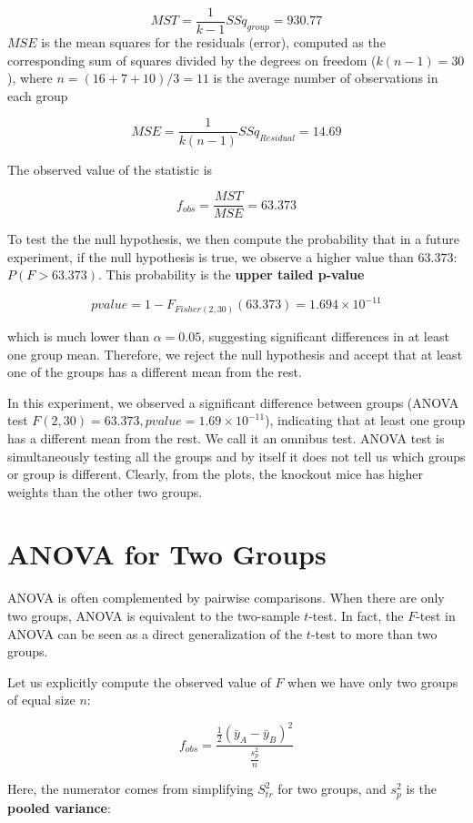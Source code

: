 \documentclass[
]{book}
\begin{document}
\[MST=\frac{1}{k-1}SSq_{group}=930.77\]
\(MSE\) is the mean squares for the residuals (error), computed as the corresponding sum of squares divided by the degrees on freedom (\(k(n-1)=30\)), where \(n=(16 + 7 + 10)/3=11\) is the average number of observations in each group

\[MSE=\frac{1}{k(n-1)}SSq_{Residual}=14.69\]

The observed value of the statistic is

\[f_{obs}=\frac{MST}{MSE}=63.373\]

To test the the null hypothesis, we then compute the probability that in a future experiment, if the null hypothesis is true, we observe a higher value than \(63.373\): \(P(F>63.373)\). This probability is the \textbf{upper tailed p-value}

\[pvalue=1-F_{Fisher(2,30)}(63.373)=1.694 \times 10^{-11}\]

which is much lower than \(\alpha=0.05\), suggesting significant differences in at least one group mean. Therefore, we reject the null hypothesis and accept that at least one of the groups has a different mean from the rest.

In this experiment, we observed a significant difference between groups (ANOVA test \(F(2,30)=63.373, pvalue= 1.69 \times 10^{-11}\)), indicating that at least one group has a different mean from the rest. We call it an omnibus test. ANOVA test is simultaneously testing all the groups and by itself it does not tell us which groups or group is different. Clearly, from the plots, the knockout mice has higher weights than the other two groups.

\hypertarget{anova-for-two-groups}{%
\section{ANOVA for Two Groups}\label{anova-for-two-groups}}

ANOVA is often complemented by pairwise comparisons. When there are only two groups, ANOVA is equivalent to the two-sample \(t\)-test. In fact, the \(F\)-test in ANOVA can be seen as a direct generalization of the \(t\)-test to more than two groups.

Let us explicitly compute the observed value of \(F\) when we have only two groups of equal size \(n\):

\[
f_{obs}=\frac{\tfrac{1}{2}(\bar{y}_{A}-\bar{y}_{B})^2}{\tfrac{s_p^2}{n}}
\]

Here, the numerator comes from simplifying \(S_{tr}^2\) for two groups, and \(s_p^2\) is the \textbf{pooled variance}:
\end{document}

